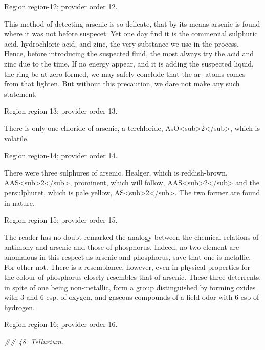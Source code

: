 \documentclass[11pt]{article}
\begin{document}
{\scriptsize\color{gray} Region region-12; provider order 12.\par}
\medskip

This method of detecting arsenic is so delicate, that by its means arsenic is found where it was not before suspecet. Yet one day find it is the commercial sulphuric acid, hydrochloric acid, and zinc, the very substance we use in the process. Hence, before introducing the suspected fluid, the most always try the acid and zinc due to the time. If no energy appear, and it is adding the suspected liquid, the ring be at zero formed, we may safely conclude that the ar- atoms comes from that lighten. But without this precaution, we dare not make any such statement.
\par

{\scriptsize\color{gray} Region region-13; provider order 13.\par}
\medskip

There is only one chloride of arsenic, a terchloride, AsO<sub>2</sub>, which is volatile.
\par

{\scriptsize\color{gray} Region region-14; provider order 14.\par}
\medskip

There were three sulphures of arsenic. Healger, which is reddish-brown, AAS<sub>2</sub>, prominent, which will follow, AAS<sub>2</sub> and the persulphuret, which is pale yellow, AS<sub>2</sub>. The two former are found in nature.
\par

{\scriptsize\color{gray} Region region-15; provider order 15.\par}
\medskip

The reader has no doubt remarked the analogy between the chemical relations of antimony and arsenic and those of phosphorus. Indeed, no two element are anomalous in this respect as arsenic and phosphorus, save that one is metallic. For other not. There is a resemblance, however, even in physical properties for the colour of phosphorus closely resembles that of arsenic. These three deterrents, in spite of one being non-metallic, form a group distinguished by forming oxides with 3 and 6 esp. of oxygen, and gaseous compounds of a field odor with 6 esp of hydrogen.
\par

{\scriptsize\color{gray} Region region-16; provider order 16.\par}
\medskip

{\small\itshape \#\# 48. Tellurium.\par}
\end{document}
